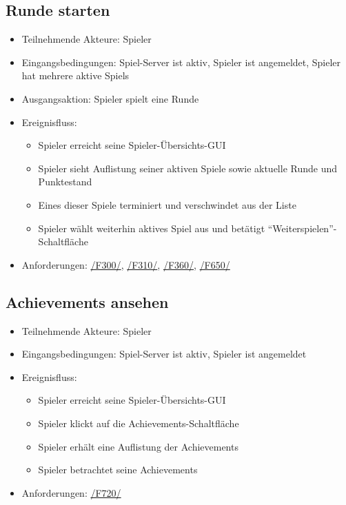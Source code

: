 \documentclass[a4paper]{scrreprt}
\begin{document}
	\subsection{Runde starten}
	\begin{itemize}
		\item Teilnehmende Akteure: \Gls{Spieler}
		\item Eingangsbedingungen: \Gls{Spiel-Server} ist aktiv, \Gls{Spieler} ist angemeldet, \Gls{Spieler} hat mehrere aktive \Glspl{Spiel}
		\item Ausgangsaktion: Spieler spielt eine Runde
		\item Ereignisfluss:
		\begin{itemize}
			\item \Gls{Spieler} erreicht seine Spieler-Übersichts-GUI
			\item \Gls{Spieler} sieht Auflistung seiner aktiven Spiele sowie aktuelle Runde und Punktestand %
			\item Eines dieser Spiele terminiert und verschwindet aus der Liste
			\item \Gls{Spieler} wählt weiterhin aktives Spiel aus und betätigt \enquote{Weiterspielen}-Schaltfläche
		\end{itemize}
		\item Anforderungen: \hyperlink{F300}{/F300/}, \hyperlink{F310}{/F310/}, \hyperlink{F360}{/F360/}, \hyperlink{F650}{/F650/}
	\end{itemize}
	
    \subsection{Achievements ansehen}
    \begin{itemize}
        \item Teilnehmende Akteure: \Gls{Spieler}
        \item Eingangsbedingungen: \Gls{Spiel-Server} ist aktiv, \Gls{Spieler} ist angemeldet
        \item Ereignisfluss:
        \begin{itemize}
            \item \Gls{Spieler} erreicht seine Spieler-Übersichts-GUI
            \item \Gls{Spieler} klickt auf die Achievements-Schaltfläche %
            \item \Gls{Spieler} erhält eine Auflistung der Achievements
            \item \Gls{Spieler} betrachtet seine Achievements
        \end{itemize}
        \item Anforderungen: \hyperlink{F720}{/F720/}
    \end{itemize}
\end{document}

